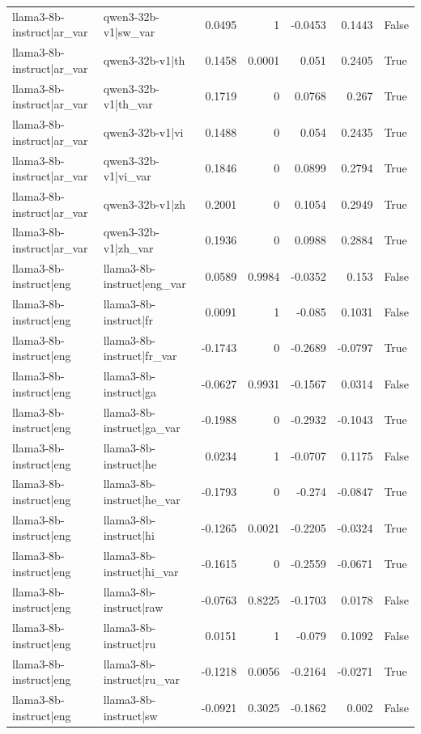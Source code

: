 \begin{table}
\begin{tabular}{l l r r r r l}
llama3-8b-instruct|ar_var & qwen3-32b-v1|sw_var & 0.0495 & 1 & -0.0453 & 0.1443 & False \\
llama3-8b-instruct|ar_var & qwen3-32b-v1|th & 0.1458 & 0.0001 & 0.051 & 0.2405 & True \\
llama3-8b-instruct|ar_var & qwen3-32b-v1|th_var & 0.1719 & 0 & 0.0768 & 0.267 & True \\
llama3-8b-instruct|ar_var & qwen3-32b-v1|vi & 0.1488 & 0 & 0.054 & 0.2435 & True \\
llama3-8b-instruct|ar_var & qwen3-32b-v1|vi_var & 0.1846 & 0 & 0.0899 & 0.2794 & True \\
llama3-8b-instruct|ar_var & qwen3-32b-v1|zh & 0.2001 & 0 & 0.1054 & 0.2949 & True \\
llama3-8b-instruct|ar_var & qwen3-32b-v1|zh_var & 0.1936 & 0 & 0.0988 & 0.2884 & True \\
llama3-8b-instruct|eng & llama3-8b-instruct|eng_var & 0.0589 & 0.9984 & -0.0352 & 0.153 & False \\
llama3-8b-instruct|eng & llama3-8b-instruct|fr & 0.0091 & 1 & -0.085 & 0.1031 & False \\
llama3-8b-instruct|eng & llama3-8b-instruct|fr_var & -0.1743 & 0 & -0.2689 & -0.0797 & True \\
llama3-8b-instruct|eng & llama3-8b-instruct|ga & -0.0627 & 0.9931 & -0.1567 & 0.0314 & False \\
llama3-8b-instruct|eng & llama3-8b-instruct|ga_var & -0.1988 & 0 & -0.2932 & -0.1043 & True \\
llama3-8b-instruct|eng & llama3-8b-instruct|he & 0.0234 & 1 & -0.0707 & 0.1175 & False \\
llama3-8b-instruct|eng & llama3-8b-instruct|he_var & -0.1793 & 0 & -0.274 & -0.0847 & True \\
llama3-8b-instruct|eng & llama3-8b-instruct|hi & -0.1265 & 0.0021 & -0.2205 & -0.0324 & True \\
llama3-8b-instruct|eng & llama3-8b-instruct|hi_var & -0.1615 & 0 & -0.2559 & -0.0671 & True \\
llama3-8b-instruct|eng & llama3-8b-instruct|raw & -0.0763 & 0.8225 & -0.1703 & 0.0178 & False \\
llama3-8b-instruct|eng & llama3-8b-instruct|ru & 0.0151 & 1 & -0.079 & 0.1092 & False \\
llama3-8b-instruct|eng & llama3-8b-instruct|ru_var & -0.1218 & 0.0056 & -0.2164 & -0.0271 & True \\
llama3-8b-instruct|eng & llama3-8b-instruct|sw & -0.0921 & 0.3025 & -0.1862 & 0.002 & False \\

\end{tabular}
\end{table}
